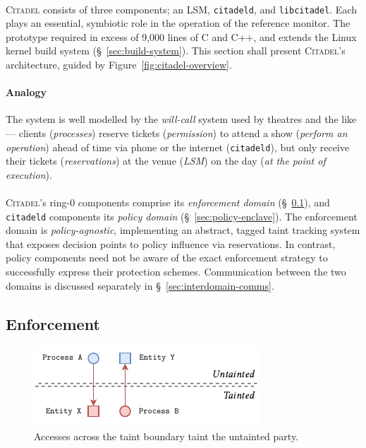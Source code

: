 \paragraph{} \textsc{Citadel} consists of three components; an LSM, \texttt{citadeld}, and \texttt{libcitadel}. Each plays an essential, symbiotic role in the operation of the reference monitor. The prototype required in excess of 9,000 lines of C and C++, and extends the Linux kernel build system (§~\ref{sec:build-system}). This section shall present \textsc{Citadel}'s architecture, guided by Figure~\ref{fig:citadel-overview}.

\paragraph{Analogy} The system is well modelled by the \textit{will-call} system used by theatres and the like --- clients (\textit{processes}) reserve tickets (\textit{permission}) to attend a show (\textit{perform an operation}) ahead of time via phone or the internet (\texttt{citadeld}), but only receive their tickets (\textit{reservations}) at the venue (\textit{LSM}) on the day (\textit{at the point of execution}).

\paragraph{} \textsc{Citadel}'s ring-0 components comprise its \textit{enforcement domain} (§~\ref{sec:enforcement-domain}), and \texttt{citadeld} components its \textit{policy domain} (§~\ref{sec:policy-enclave}). The enforcement domain is \textit{policy-agnostic}, implementing an abstract, tagged taint tracking system that exposes decision points to policy influence via reservations. In contrast, policy components need not be aware of the exact enforcement strategy to successfully express their protection schemes. Communication between the two domains is discussed separately in §~\ref{sec:interdomain-comms}.



\subsection{Enforcement}
\label{sec:enforcement-domain}

\begin{figure}[]
    \centering
    \includegraphics[width=0.55\linewidth]{figures/CitadelTaint.pdf}
    \caption[Accesses across the taint boundary]{Accesses across the taint boundary taint the untainted party.}
    \label{fig:taint-boundary}
\end{figure}

